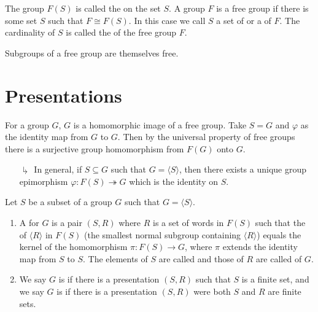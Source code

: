 \documentclass[12pt, a4paper, oneside, openright, titlepage]{book}
\begin{document}
\begin{defn}
        The group $F(S)$ is called the  on the set $S$. A group $F$ is a free group if there is some set $S$ such that $F \cong F(S)$. In this case we call $S$ a set of  or a  of $F$. The cardinality of $S$ is called the  of the free group $F$.
\end{defn}

\begin{thm}[Schreier]
        Subgroups of a free group are themselves free.
\end{thm}





        



\section{\textsection Presentations}


\begin{rmk}
        For a group $G$, $G$ is a homomorphic image of a free group. Take $S = G$ and $\varphi$ as the identity map from $G$ to $G$. Then by the universal property of free groups there is a surjective group homomorphism from $F(G)$ onto $G$.
        \begin{enumerate}
                \item[$\drsh$] In general, if $S \subseteq G$ such that $G = \langle S \rangle$, then there exists a unique group epimorphism $\varphi:F(S)\twoheadrightarrow G$ which is the identity on $S$.
        \end{enumerate}
\end{rmk}

\begin{defn}
        Let $S$ be a subset of a group $G$ such that $G = \langle S \rangle$. \begin{enumerate}
                \item A  for $G$ is a pair $(S,R)$ where $R$ is a set of words in $F(S)$ such that the  of $\langle R \rangle$ in $F(S)$ (the smallest normal subgroup containing $\langle R\rangle$) equals the kernel of the homomorphism $\pi:F(S)\rightarrow G$, where $\pi$ extends the identity map from $S$ to $S$. The elements of $S$ are called  and those of $R$ are called  of $G$.
                \item We say $G$ is  if there is a presentation $(S,R)$ such that $S$ is a finite set, and we say $G$ is  if there is a presentation $(S,R)$ were both $S$ and $R$ are finite sets.
        \end{enumerate}
\end{defn}
\end{document}
